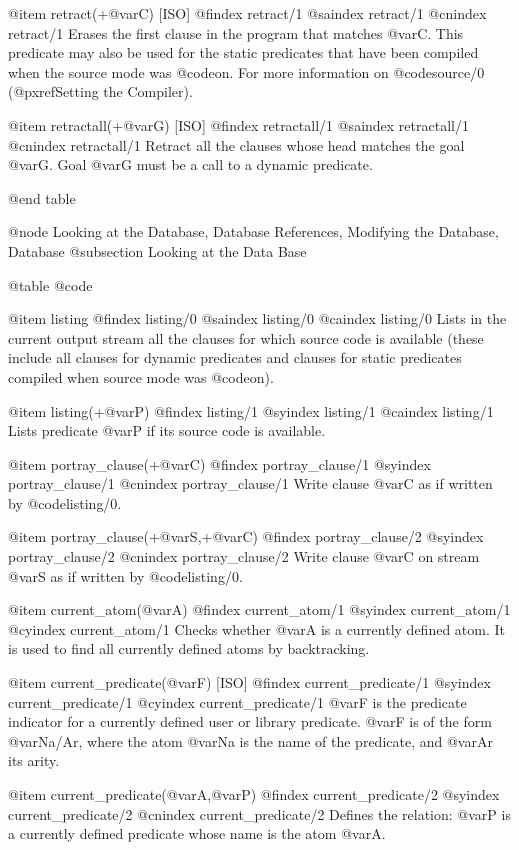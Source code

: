 {{{{{@item retract(+@var{C}) [ISO]
@findex retract/1
@saindex retract/1
@cnindex retract/1
Erases the first clause in the program that matches @var{C}. This
predicate may also be used for the static predicates that have been
compiled when the source mode was @code{on}. For more information on
@code{source/0} (@pxref{Setting the Compiler}).

@item retractall(+@var{G}) [ISO]
@findex retractall/1
@saindex retractall/1
@cnindex retractall/1
Retract all the clauses whose head matches the goal @var{G}. Goal
@var{G} must be a call to a dynamic predicate.

@end table

@node Looking at the Database, Database References, Modifying the Database, Database
@subsection Looking at the Data Base

@table @code

@item listing
@findex listing/0
@saindex listing/0
@caindex listing/0
Lists in the current output stream all the clauses for which source code
is available (these include all clauses for dynamic predicates and
clauses for static predicates compiled when source mode was @code{on}).

@item listing(+@var{P})
@findex listing/1
@syindex listing/1
@caindex listing/1
Lists predicate @var{P} if its source code is available.

@item portray_clause(+@var{C})
@findex portray_clause/1
@syindex portray_clause/1
@cnindex portray_clause/1
Write clause @var{C} as if written by @code{listing/0}.

@item portray_clause(+@var{S},+@var{C})
@findex portray_clause/2
@syindex portray_clause/2
@cnindex portray_clause/2
Write clause @var{C} on stream @var{S} as if written by @code{listing/0}.

@item current_atom(@var{A})
@findex current_atom/1
@syindex current_atom/1
@cyindex current_atom/1
Checks whether @var{A} is a currently defined atom. It is used to find all
currently defined atoms by backtracking.

@item current_predicate(@var{F}) [ISO]
@findex current_predicate/1
@syindex current_predicate/1
@cyindex current_predicate/1
@var{F} is the predicate indicator for a currently defined user or
library predicate. @var{F} is of the form @var{Na/Ar}, where the atom
@var{Na} is the name of the predicate, and @var{Ar} its arity.

@item current_predicate(@var{A},@var{P})
@findex current_predicate/2
@syindex current_predicate/2
@cnindex current_predicate/2
Defines the relation: @var{P} is a currently defined predicate whose
name is the atom @var{A}.

}}}}}
